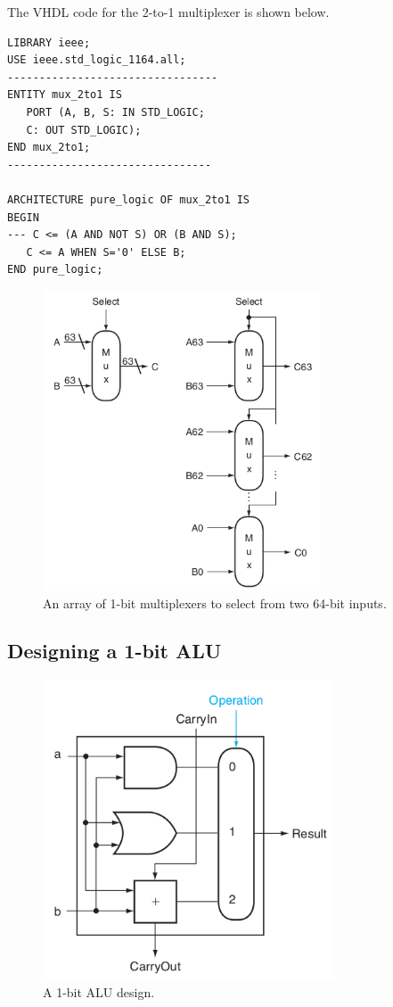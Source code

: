 \documentclass[a4paper, 11pt,oneside]{article}
\begin{document}
The VHDL code for the 2-to-1 multiplexer is shown below.
\begin{verbatim}
LIBRARY ieee;
USE ieee.std_logic_1164.all;
---------------------------------
ENTITY mux_2to1 IS
   PORT (A, B, S: IN STD_LOGIC;
   C: OUT STD_LOGIC);
END mux_2to1;
--------------------------------

ARCHITECTURE pure_logic OF mux_2to1 IS
BEGIN
--- C <= (A AND NOT S) OR (B AND S);                       
   C <= A WHEN S='0' ELSE B;
END pure_logic;
\end{verbatim}



\begin{figure}[H]
	\begin{center}
	\includegraphics[height=3.5in]{mux_bits.png}
	\caption{An array of 1-bit multiplexers to select from two 64-bit inputs.}
	\label{fig:mux_bits} 
	\end{center}
\end{figure}

\subsection{Designing a 1-bit ALU}

\begin{figure}[H]
	\begin{center}
		\includegraphics[height=3.5in]{alu.png}
		\caption{A 1-bit ALU design.}
		\label{fig:alu} 
	\end{center}
\end{figure}
\end{document}
